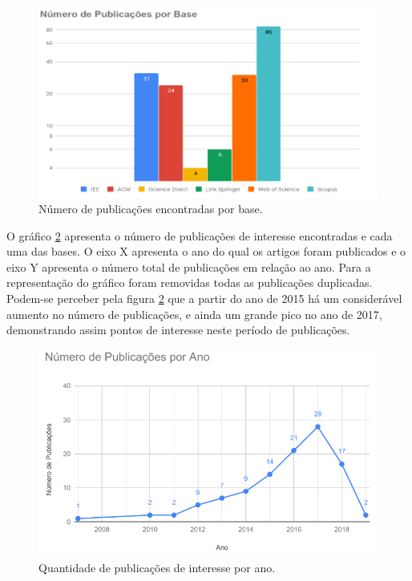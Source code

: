 \documentclass[tid,table]{texufpel} %
\begin{document}
\begin{figure}[ht]
	\centering
	\includegraphics[width=.9\textwidth]{imagens/GrafBarraPubAno.png}
	\caption{Número de publicações encontradas por base.}
	\label{fig:GrafBarraPubAno}
\end{figure}


O gráfico \ref{fig:grafPublicaAno} apresenta o número de publicações de interesse encontradas e cada uma das bases. O eixo X apresenta o ano do qual os artigos foram publicados e o eixo Y apresenta o número total de publicações em relação ao ano. Para a representação do gráfico foram removidas todas as publicações duplicadas. Podem-se perceber pela figura \ref{fig:grafPublicaAno} que a partir do ano de 2015 há um considerável aumento no número de publicações, e ainda um grande pico no ano de 2017, demonstrando assim pontos de interesse neste período de publicações.

\begin{figure}[ht]
	\centering
	\includegraphics[width=.9\textwidth]{imagens/grafPublicaAno.png}
	\caption{Quantidade de publicações de interesse por ano.}
	\label{fig:grafPublicaAno}
\end{figure}
\end{document}
